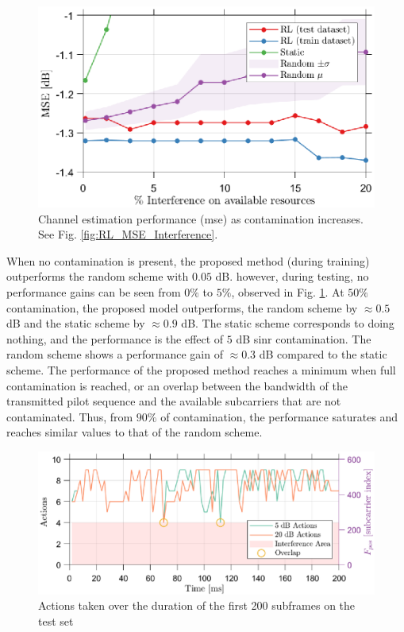 \begin{figure}
    \centering
    \includegraphics{chapters/part_uplink/figures/results/MSE_Interference_zoomedin.eps}
    \caption{Channel estimation performance (\gls{mse}) as contamination increases. See Fig. \ref{fig:RL_MSE_Interference}.}
    \label{fig:RL_MSE_Interference_zoomedin}
\end{figure}

When no contamination is present, the proposed method (during training) outperforms the random scheme with $0.05$ dB. however, during testing, no performance gains can be seen from $0\%$ to $5\%$, observed in Fig. \ref{fig:RL_MSE_Interference_zoomedin}. 
At $50\%$ contamination, the proposed model outperforms, the random scheme by $\approx 0.5$ dB and the static scheme by $\approx 0.9$ dB. The static scheme corresponds to doing nothing, and the performance is the effect of $5$ dB \gls{sinr} contamination. The random scheme shows a performance gain of $\approx 0.3$ dB compared to the static scheme. The performance of the proposed method reaches a minimum when full contamination is reached, or an overlap between the bandwidth of the transmitted pilot sequence and the available subcarriers that are not contaminated. Thus, from $90\%$ of contamination, the performance saturates and reaches similar values to that of the random scheme. 

\begin{figure}
    \centering
    \includegraphics{chapters/part_uplink/figures/results/action_timeseries.eps}
    \caption{Actions taken over the duration of the first 200 subframes on the test set}
    \label{fig:RL_action_timeseries}
\end{figure}

